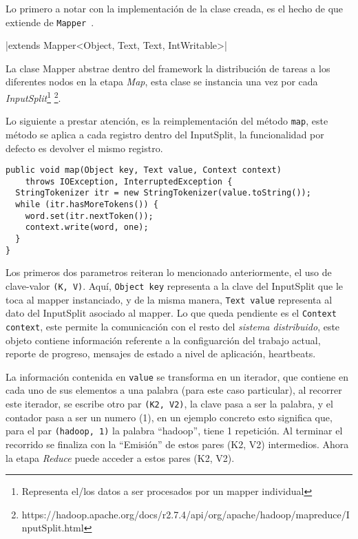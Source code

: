 Lo primero a notar con la implementación de la clase creada,
es el hecho de que extiende de {\tt Mapper}~\cite{apache_hadoop_mapper}. 

|extends Mapper<Object, Text, Text, IntWritable>|

La clase Mapper abstrae dentro del \gls{framework} la distribución de tareas a
los diferentes nodos en la etapa {\it Map}, esta clase se instancia una vez por
cada {\it InputSplit}\footnote{Representa el/los datos a ser procesados por un mapper
individual} \footnote{https://hadoop.apache.org/docs/r2.7.4/api/org/apache/hadoop/mapreduce/InputSplit.html}.

Lo siguiente a prestar atención, es la reimplementación del método {\tt map},
este método se aplica a cada registro dentro del InputSplit, la funcionalidad
por defecto es devolver el mismo registro.

\begin{verbatim}
public void map(Object key, Text value, Context context) 
    throws IOException, InterruptedException {
  StringTokenizer itr = new StringTokenizer(value.toString());
  while (itr.hasMoreTokens()) {
    word.set(itr.nextToken());
    context.write(word, one);
  }
}
\end{verbatim}

Los primeros dos parametros reiteran lo mencionado anteriormente, el uso de clave-valor
{\tt (K, V)}. Aquí, {\tt Object key} representa a la clave del InputSplit
que le toca al mapper instanciado, y de la misma manera, {\tt Text value}
representa al dato del InputSplit asociado al mapper. Lo que queda pendiente es
el {\tt Context context}, este permite la comunicación con el resto del {\it sistema
distribuido}, este objeto contiene información referente a la configuarción del
trabajo actual, reporte de progreso, mensajes de estado a nivel de aplicación, 
\glspl{heartbeat}.

La información contenida en {\tt value} se transforma en un iterador, que
contiene en cada uno de sus elementos a una palabra (para este caso
particular), al recorrer este iterador, se escribe otro par {\tt (K2, V2)}, la
clave pasa a ser la palabra, y el contador pasa a ser un numero (1), en un
ejemplo concreto esto significa que, para el par {\tt (hadoop, 1)} la palabra
``hadoop'', tiene 1 repetición. Al terminar el recorrido se finaliza con la
``Emisión'' de estos pares (K2, V2) intermedios. Ahora la etapa {\it Reduce}
puede acceder a estos pares (K2, V2).
